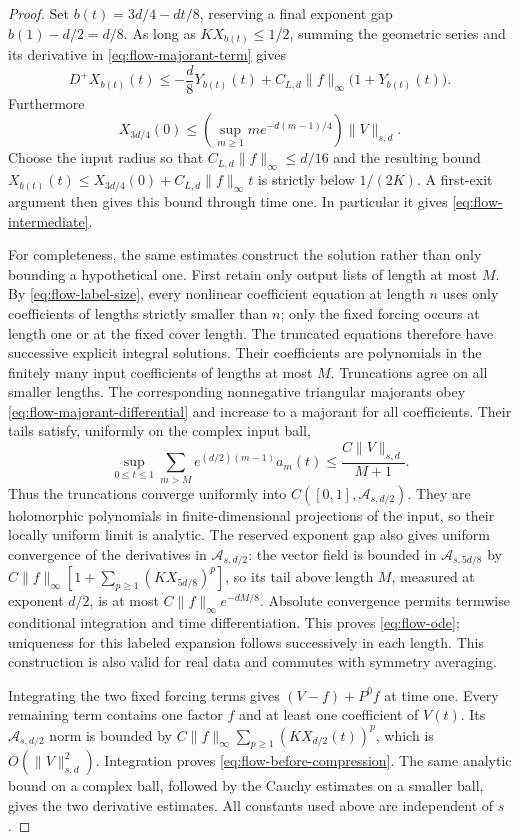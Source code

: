 \begin{proof}
Set \(b(t)=3d/4-dt/8\), reserving a final exponent gap
\(b(1)-d/2=d/8\).  As long as \(KX_{b(t)}\le1/2\), summing the
geometric series and its derivative in \eqref{eq:flow-majorant-term}
gives
\begin{equation}\label{eq:flow-majorant-differential}
 D^+X_{b(t)}(t)
 \le -\frac d8Y_{b(t)}(t)
       +C_{L,d}\|f\|_\infty\bigl(1+Y_{b(t)}(t)\bigr).
\end{equation}
Furthermore
\[
 X_{3d/4}(0)\le
 \left(\sup_{m\ge1}m e^{-d(m-1)/4}\right)\|V\|_{s,d}.
\]
Choose the input radius so that \(C_{L,d}\|f\|_\infty\le d/16\) and
the resulting bound
\(X_{b(t)}(t)\le X_{3d/4}(0)+C_{L,d}\|f\|_\infty t\) is strictly
below \(1/(2K)\).  A first-exit argument then gives this bound through
time one.  In particular it gives \eqref{eq:flow-intermediate}.

For completeness, the same estimates construct the solution rather than
only bounding a hypothetical one.  First retain only output lists of
length at most \(M\).  By \eqref{eq:flow-label-size}, every nonlinear
coefficient equation at length \(n\) uses only coefficients of lengths
strictly smaller than \(n\); only the fixed forcing occurs at length one
or at the fixed cover length.  The truncated equations therefore have
successive explicit integral solutions.  Their coefficients are
polynomials in the finitely many input coefficients of lengths at most
\(M\).  Truncations agree on all smaller lengths.  The corresponding
nonnegative triangular majorants obey
\eqref{eq:flow-majorant-differential} and increase to a majorant for all
coefficients.  Their tails satisfy, uniformly on the complex input ball,
\[
 \sup_{0\le t\le1}\sum_{m>M}e^{(d/2)(m-1)}a_m(t)
 \le \frac{C\|V\|_{s,d}}{M+1}.
\]
Thus the truncations converge uniformly into
\(C([0,1],\mathcal A_{s,d/2})\).  They are holomorphic polynomials in
finite-dimensional projections of the input, so their locally uniform
limit is analytic.  The reserved exponent gap also gives uniform
convergence of the derivatives in \(\mathcal A_{s,d/2}\): the vector
field is bounded in \(\mathcal A_{s,5d/8}\) by
\(C\|f\|_\infty[1+\sum_{p\ge1}(KX_{5d/8})^p]\), so its tail above
length \(M\), measured at exponent \(d/2\), is at most
\(C\|f\|_\infty e^{-dM/8}\).  Absolute convergence permits termwise
conditional integration and time differentiation.  This proves
\eqref{eq:flow-ode}; uniqueness for this labeled expansion follows
successively in each length.  This construction is also valid for real
data and commutes with symmetry averaging.

Integrating the two fixed forcing terms gives
\((V-f)+P^0f\) at time one.  Every remaining term contains one factor
\(f\) and at least one coefficient of \(V(t)\).  Its
\(\mathcal A_{s,d/2}\) norm is bounded by
\(C\|f\|_\infty\sum_{p\ge1}(KX_{d/2}(t))^p\), which is
\(O(\|V\|_{s,d}^2)\).  Integration proves
\eqref{eq:flow-before-compression}.  The same analytic bound on a complex
ball, followed by the Cauchy estimates on a smaller ball, gives the two
derivative estimates.  All constants used above are independent of \(s\).
\end{proof}

